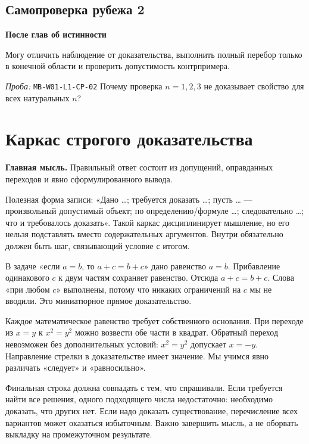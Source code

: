 \documentclass[11pt,a4paper,openany]{book}
\newcommand{\mtag}[1]{\textsf{\small\color{mbaccent}\bfseries #1}}
\newcommand{\muid}[1]{\texttt{\footnotesize #1}}
\begin{document}
\subsection*{Самопроверка рубежа 2}\mtag{После глав об истинности}\par Могу отличить наблюдение от доказательства, выполнить полный перебор только в конечной области и проверить допустимость контрпримера.\par \textit{Проба:} \muid{MB-W01-L1-CP-02} Почему проверка $n=1,2,3$ не доказывает свойство для всех натуральных $n$?

\medskip

\section{Каркас строгого доказательства}\label{theory:6}

\begin{keybox}\textbf{Главная мысль.} Правильный ответ состоит из допущений, оправданных переходов и явно сформулированного вывода.\end{keybox}

Полезная форма записи: «Дано …; требуется доказать …; пусть … — произвольный допустимый объект; по определению/формуле …; следовательно …; что и требовалось доказать». Такой каркас дисциплинирует мышление, но его нельзя подставлять вместо содержательных аргументов. Внутри обязательно должен быть шаг, связывающий условие с итогом.


В задаче «если $a=b$, то $a+c=b+c$» дано равенство $a=b$. Прибавление одинакового $c$ к двум частям сохраняет равенство. Отсюда $a+c=b+c$. Слова «при любом $c$» выполнены, потому что никаких ограничений на $c$ мы не вводили. Это миниатюрное прямое доказательство.


Каждое математическое равенство требует собственного основания. При переходе из $x=y$ к $x^2=y^2$ можно возвести обе части в квадрат. Обратный переход невозможен без дополнительных условий: $x^2=y^2$ допускает $x=-y$. Направление стрелки в доказательстве имеет значение. Мы учимся явно различать «следует» и «равносильно».


Финальная строка должна совпадать с тем, что спрашивали. Если требуется найти все решения, одного подходящего числа недостаточно: необходимо доказать, что других нет. Если надо доказать существование, перечисление всех вариантов может оказаться избыточным. Важно завершить мысль, а не оборвать выкладку на промежуточном результате.


\begin{center}
\end{center}
\end{document}
